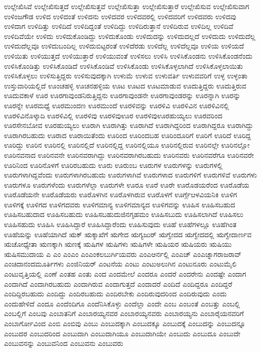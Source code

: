 {ಉಲ್ಲೇಖಿಸಿವೆ
ಉಲ್ಲೇಖಿಸುತ್ತದೆ
ಉಲ್ಲೇಖಿಸುತ್ತವೆ
ಉಲ್ಲೇಖಿಸುತ್ತಾ
ಉಲ್ಲೇಖಿಸುತ್ತಾರೆ
ಉಲ್ಲೇಖಿಸುವ
ಉಲ್ಲೇಖಿಸುವಾಗ
ಉಳಿಂಜಗೌಡ
ಉಳಿದ
ಉಳಿದಂತೆ
ಉಳಿದನು
ಉಳಿದವರ
ಉಳಿದವರಲ್ಲಿ
ಉಳಿದವರಿಗೆ
ಉಳಿದವರು
ಉಳಿದವು
ಉಳಿದಾಗ
ಉಳಿದಿತ್ತು
ಉಳಿದಿದೆ
ಉಳಿದಿದ್ದಂತೆ
ಉಳಿದಿದ್ದು
ಉಳಿದಿರುತ್ತಾನೆ
ಉಳಿದಿರುವ
ಉಳಿದಿಲ್ಲ
ಉಳಿದಿವೆ
ಉಳಿದಿವೆಯೇ
ಉಳಿದು
ಉಳಿದುಕೊಂಡಿದ್ದು
ಉಳಿದುಕೊಂಡು
ಉಳಿದುದನ್ನು
ಉಳಿದುದಲ್ಲದೆ
ಉಳಿದುದು
ಉಳಿದುದೆಲ್ಲ
ಉಳಿದುದೆಲ್ಲವೂ
ಉಳಿದುಬಂದಿಲ್ಲ
ಉಳಿದುಬಿಟ್ಟರಂತೆ
ಉಳಿದೆರಡು
ಉಳಿದೆಲ್ಲ
ಉಳಿದೆಲ್ಲವೂ
ಉಳಿಯ
ಉಳಿಯದೆ
ಉಳಿಯಿತು
ಉಳಿಯುತ್ತದೆ
ಉಳಿಯುತ್ತಾರೆ
ಉಳಿಯುವಂತೆ
ಉಳಿಸಲು
ಉಳಿಸಿ
ಉಳಿಸಿಕೊಂಡನು
ಉಳಿಸಿಕೊಂಡನೆಂದು
ಉಳಿಸಿಕೊಂಡಿತ್ತು
ಉಳಿಸಿಕೊಂಡಿದೆ
ಉಳಿಸಿಕೊಂಡಿವೆ
ಉಳಿಸಿಕೊಂಡು
ಉಳಿಸಿಕೊಳ್ಳಲಾಗಿದೆ
ಉಳಿಸಿಕೊಳ್ಳಲಾಯಿತು
ಉಳಿಸಿಕೊಳ್ಳಲು
ಉಳಿಸುತ್ತಿದ್ದರು
ಉಳಿಸುವುದಕ್ಕಾಗಿ
ಉಳುಮೆ
ಉಳುವ
ಉಳುವರ್ತಿ
ಉಳುವವರಿಗೆ
ಉಳ್ಳ
ಉಳ್ಳಂತಾ
ಉಸ್ತುವಾರಿಯಲ್ಲಿದೆ
ಊಂಚಹಳ್ಳಿ
ಊಚನಹಳ್ಳಿಯ
ಊಟ
ಊಟದ
ಊಟಮಾಡುವ
ಊದುತ್ತಿದ್ದರು
ಊದುತ್ತಿರುವ
ಊದುವಕಾಳೆ
ಊರ
ಊರಗಾವುಂಡನಿರುತ್ತಿದ್ದನು
ಊರಗಾವುಂಡನೇ
ಊರಗಾವುಂಡರನ್ನು
ಊರನ್ನಾಗಿ
ಊರನ್ನು
ಊರನ್ನೇ
ಊರಮಧ್ಯೆ
ಊರಮುಂದಣ
ಊರಮುಂದೆ
ಊರಳಿವನ್ನು
ಊರಳಿವಿ
ಊರಳಿವಿನ
ಊರಳಿವಿನಲ್ಲಿ
ಊರಳಿವಿನೊಳ್ಕಾದಿ
ಊರಳಿವಿಲ್ಲಿ
ಊರಳಿವು
ಊರಳಿವುಊರ
ಊರಳಿವುಊರಹುಯ್ಯಲು
ಊರವರಿಂದ
ಊರಸೇನಬೋವ
ಊರಹುಯ್ಯಲು
ಊರಾಗಿ
ಊರಾಗಿತ್ತು
ಊರಾಗಿದೆ
ಊರಾಗಿದ್ದರಿಂದ
ಊರಾಗಿದ್ದರೂ
ಊರಾಗಿದ್ದು
ಊರಾಗಿರಬಹುದು
ಊರಾದ
ಊರಾಯಿತೆಂದು
ಊರಿಂದ
ಊರಿಂದಬಹ
ಊರಿಂದೂರಿಗೆ
ಊರಿಗೆ
ಊರಿದೆ
ಊರಿದ್ದ
ಊರಿದ್ದು
ಊರಿನ
ಊರಿನಲ್ಲಿ
ಊರಿನಲ್ಲಿದೆ
ಊರಿನಲ್ಲಿದ್ದ
ಊರಿನಲ್ಲಿಯೂ
ಊರಿನಲ್ಲಿರುವ
ಊರಿನಲ್ಲೇ
ಊರಿನಲ್ಲೋ
ಊರಿನವನಾದ
ಊರಿನವನೇ
ಊರಿನವರಾಗಿದ್ದು
ಊರಿನವರಾಗಿರಬಹುದು
ಊರಿನವರು
ಊರಿನವರೆಗೂ
ಊರಿನವರೇ
ಊರಿನಿಂದ
ಊರಿನೊಳಗೆ
ಊರಿರಬಹುದು
ಊರು
ಊರುಂಬ
ಊರುಗಳ
ಊರುಗಳನ್ನು
ಊರುಗಳಲ್ಲಿ
ಊರುಗಳಾಗಿದ್ದವೆಂದು
ಊರುಗಳಾಗಿರಬಹುದು
ಊರುಗಳಾಗಿವೆ
ಊರುಗಳಾದ
ಊರುಗಳಿಗೆ
ಊರುಗಳಿವೆ
ಊರುಗಳು
ಊರುಗಳೂ
ಊರುಗಳೆಂದು
ಊರುಗಳೆಲ್ಲಾ
ಊರುಗಳೇ
ಊರೂ
ಊರೆ
ಊರೇ
ಊರೊಡಯರೆಂದ
ಊರೊಡೆಯ
ಊರೊಡೆಯನೇ
ಊರೊಡೆಯರು
ಊರೊಳಗಿನ
ಊರೊಳಗಿರುವ
ಊರೊಳಗೆ
ಊರ್ಗ್ಗೆೞಳವಿಯನಿಕಿ
ಊಳಿಗ
ಊಳಿಗಕ್ಕೆ
ಊಳಿಗದ
ಊಳಿಗದವರು
ಊಳಿಗಮಾನ್ಯ
ಊಳಿಗಮಾನ್ಯದ
ಊಳಿಗವನ್ನು
ಊಹಿಸ
ಊಹಿಸಬಹುದ
ಊಹಿಸಬಹುದಾದ
ಊಹಿಸಬಹುದು
ಊಹಿಸಬಹುದುಜಿನಗೃಹಮಂ
ಊಹಿಸಬುದು
ಊಹಿಸಲಾಗಿದೆ
ಊಹಿಸಲು
ಊಹಿಸಹುದು
ಊಹಿಸಿ
ಊಹಿಸಿದ್ದಾರೆ
ಊಹಿಸಿದ್ದಾರೆಂದು
ಊಹಿಸುವುದು
ಊಹೆ
ಊಹೆಗಳಲ್ಲೂ
ಊಹೆಗಿಂತ
ಊಹೆಯನ್ನು
ಊಹೆಯಾಗಿದೆ
ಋಕ್
ಋಕ್ಶಾಖೆಗೆ
ಋಗೇದ
ಋಗ್ಯಜುರ್
ಋಗ್ವೇದದ
ಋಗ್ವೇದದಲ್ಲಿ
ಋಗ್ವೇದಾರ್ಣವ
ಋಚೋಧ್ಯೇತಾ
ಋಣಕ್ಕಾಗಿ
ಋಣಕ್ಕೆ
ಋಷಿಗಳ
ಋಷಿಗಳು
ಋಷಿಗಳೇ
ಋಷಿಯರ
ಋಷಿಯರು
ಋಷಿಯು
ಋಷಿಸಮುದಾಯ
ಎ
ಎಂ
ಎಂಎಂ
ಎಂಎಂಕಲಬುರ್ಗಿಯವರು
ಎಂಎಆರ್ನಲ್ಲಿ
ಎಂಎಚ್
ಎಂಎಚ್ನಾಗರಾಜರಾವ್
ಎಂಚಿದಾನಂದಮೂರ್ತಿಗಳು
ಎಂಜಿನಿಯರ್
ಎಂಟನೆಯ
ಎಂಟು
ಎಂಟುಅಲುಗಿನ
ಎಂಟುನೂರು
ಎಂಟುಮೈಲಿ
ಎಂಟುವೃತ್ತಿಯಲ್ಲಿ
ಎಂಣೆ
ಎಂತಹ
ಎಂತು
ಎಂದ
ಎಂದಮೇಲೆ
ಎಂದರೂ
ಎಂದರೆ
ಎಂದರೇನು
ಎಂದಷ್ಟೇ
ಎಂದಾಗ
ಎಂದಾಗಿದೆ
ಎಂದಾಗಿರಬಹುದು
ಎಂದಾಗಿರುವ
ಎಂದಾಗುತ್ತದೆ
ಎಂದಾದರೆ
ಎಂದಿದೆ
ಎಂದಿದ್ದರೂ
ಎಂದಿದ್ದರೆ
ಎಂದಿದ್ದಿರಬಹುದು
ಎಂದಿದ್ದು
ಎಂದಿರಬಹುದು
ಎಂದಿರಬೇಕು
ಎಂದಿರುವುದರಿಂದ
ಎಂದಿರುವುದು
ಎಂದು
ಎಂದುಹೇಳಿದೆ
ಎಂದೂ
ಎಂದೆಂದಿಗೂ
ಎಂದೆನಿಸಿಕೊಳ್ಳು
ಎಂದೆಲ್ಲಾ
ಎಂದೇ
ಎಂಬ
ಎಂಬಂತೆ
ಎಂಬತ್ತು
ಎಂಬಲ್ಲಿ
ಎಂಬಲ್ಲಿಗೆ
ಎಂಬವು
ಎಂಬಾತನಿಗೆ
ಎಂಬಾರಯ್ಯನವರ
ಎಂಬಾರಯ್ಯನವರು
ಎಂಬಾರಯ್ಯನು
ಎಂಬಾರೈಯನವರಿಗೆ
ಎಂಬಾರ್ಗೋವಿಂದ
ಎಂಬಿ
ಎಂಬಿವು
ಎಂಬು
ಎಂಬುದಕ್ಕಾಗಿ
ಎಂಬುದಕ್ಕೂ
ಎಂಬುದಕ್ಕೆ
ಎಂಬುದನ್ನು
ಎಂಬುದನ್ನೂ
ಎಂಬುದರ
ಎಂಬುದರಿಂದ
ಎಂಬುದಾಗಿ
ಎಂಬುದಾಗಿಯೂ
ಎಂಬುದಾಗಿಯೇ
ಎಂಬುದು
ಎಂಬುದೂ
ಎಂಬುದೇ
ಎಂಬುವನನ್ನು
ಎಂಬುವನಿಂದ
ಎಂಬುವನು
ಎಂಬುವರು
}
